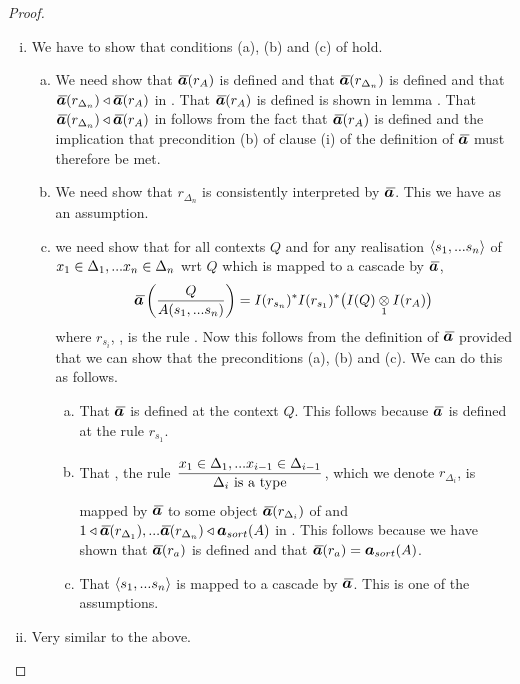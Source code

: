 \begin{proof}
\begin{enumerate}[(i) ]
    \item We have to show that conditions (a), (b) and (c) of  hold.
    \begin{enumerate}[(a)]
        \item We need show that $\Ibar(r_A)$ is defined and that $\Ibar(r_{\Delta_n})$ is defined and that $\Ibar(r_{\Delta_n}) \base \Ibar(r_A)$ in \catc.
        That $\Ibar(r_A)$ is defined is shown in lemma . That $\Ibar(r_{\Delta_n}) \base \Ibar(r_A)$ in \catc follows from 
        the fact that $\Ibar(r_A)$ is defined and the implication that precondition (b) of clause (i) of the definition of $\Ibar$ must therefore be met.
        \item We need show that $r_{\Delta_n}$ is consistently interpreted by $\Ibar$. This we have as an assumption.
        \item we need show that for all contexts $Q$ and for any realisation $\langle s_1,...s_n\rangle$ of $x_1 \in \Delta_1,... x_{n} \in \Delta_{n}$ wrt $Q$
        which is mapped to a cascade by $\Ibar$,
        $$\ibarmappedrule{Q}{A(s_1,...s_n)}=I(r_{s_n})^*I(r_{s_1})^*\big(\crossx{I(Q)}{I(r_A)}{1}\big)$$
        where $r_{s_i}$, \foreachi, is the rule .
        Now this follows from the definition of $\Ibar$ provided that we can show that the preconditions (a), (b) and (c). 
        We can do this as follows.
        \begin{enumerate}[(a)]
            \item That $\Ibar$ is defined at the context $Q$. 
            This follows because $\Ibar$ is defined at the rule $r_{s_1}$. 
             
            \item That \foreachi, the rule $\IDelta{i}$, which we denote $r_{\Delta_i}$, is mapped by $\Ibar$ to some object $\Ibar(r_{\Delta_i})$ of \catcw
            and $1 \base \Ibar(r_{\Delta_1}),...\Ibar(r_{\Delta_n}) \base \iI_{sort}(A)$ in \catcw. 
            This follows because we have shown that $\Ibar(r_a)$ is defined
            and that $\Ibar(r_a)= \iI_{sort}(A)$. 
           \item That $\langle s_1,...s_n\rangle$ is mapped to a cascade by $\Ibar$. This is one of the assumptions.
        \end{enumerate}
    \end{enumerate}
    \item Very similar to the above.
\end{enumerate}
\end{proof}


